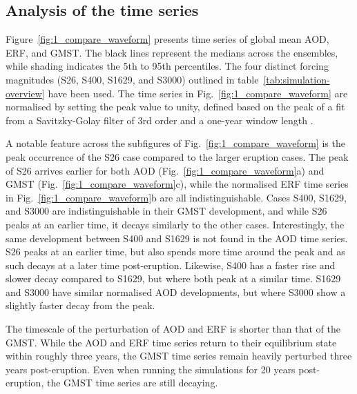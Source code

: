 \documentclass[draft]{agujournal2019}
\begin{document}
  \subsection{Analysis of the time series}

  Figure~\ref{fig:1_compare_waveform} presents time series of global mean AOD, ERF, and
  GMST. The black lines represent the medians across the ensembles, while shading
  indicates the 5th to 95th percentiles. The four distinct forcing magnitudes (S26,
  S400, S1629, and S3000) outlined in table~\ref{tab:simulation-overview} have been
  used. The time series in Fig.~\ref{fig:1_compare_waveform} are normalised by setting
  the peak value to unity, defined based on the peak of a fit from a Savitzky-Golay
  filter of 3rd order and a one-year window length \cite{savitzky1964}.

  A notable feature across the subfigures of Fig.~\ref{fig:1_compare_waveform} is the
  peak occurrence of the S26 case compared to the larger eruption cases. The peak of S26
  arrives earlier for both AOD (Fig.~\ref{fig:1_compare_waveform}a) and GMST
  (Fig.~\ref{fig:1_compare_waveform}c),  while the normalised ERF
  time series in Fig.~\ref{fig:1_compare_waveform}b are all indistinguishable. Cases
  S400, S1629, and S3000 are indistinguishable in their GMST development, and while S26
  peaks at an earlier time, it decays similarly to the other cases. Interestingly, the
  same development between S400 and S1629 is not found in the AOD time series. S26 peaks
  at an earlier time, but also spends more time around the peak and as such decays at a
  later time post-eruption. Likewise, S400 has a faster rise and slower decay compared
  to S1629, but where both peak at a similar time. S1629 and S3000 have
   similar normalised AOD developments, but where S3000 show a
  slightly faster decay from the peak.

  The timescale of the perturbation of AOD and ERF is shorter than that of the GMST.
  While the AOD and ERF time series return to their equilibrium state within roughly
  three years, the GMST time series remain heavily perturbed three years post-eruption.
  Even when running the simulations for 20 years post-eruption, the GMST time series are
  still decaying.
\end{document}
